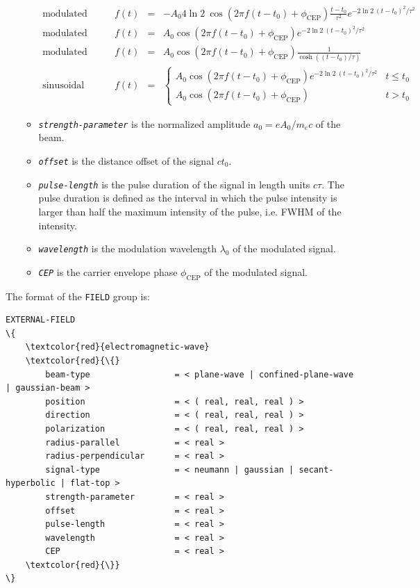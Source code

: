 \begin{enumerate}
\begin{itemize}
	\begin{equation}
	\renewcommand{\arraystretch}{1.5}
	\begin{array}{lrcl}
	\mbox{modulated Neumann:}  \qquad & f(t) & = & \displaystyle - A_0 4 \ln 2 \: \cos( 2 \pi f (t - t_0) + \phi_\mathrm{CEP} ) \frac{t - t_0}{\tau^2} e^{-2 \ln 2 \: (t - t_0)^2/\tau^2 } \\
	\mbox{modulated Gaussian:} \qquad & f(t) & = & \displaystyle A_0 \cos( 2 \pi f (t - t_0) + \phi_\mathrm{CEP} ) e^{-2 \ln 2 \: (t - t_0)^2/\tau^2 } \\
	\mbox{modulated hyperbolic secant:} \qquad & f(t) & = & \displaystyle A_0 \cos( 2 \pi f (t - t_0) + \phi_\mathrm{CEP} ) \frac{1}{\cosh ( (t - t_0)/\tau ) } \\
	\mbox{sinusoidal pulse:}   \qquad & f(t) & = & \displaystyle \left\{ \begin{array}{ll} A_0 \cos( 2 \pi f (t - t_0) + \phi_\mathrm{CEP} ) e^{-2 \ln 2 \: (t - t_0)^2/\tau^2 } & t \leq t_0 \\ A_0 \cos( 2 \pi f (t - t_0) + \phi_\mathrm{CEP} ) & t > t_0 \end{array} \right.
	\end{array}
	\end{equation}
	\item {\tt \small \em strength-parameter} is the normalized amplitude $a_0 = e A_0 / m_ec $ of the beam.
	\item {\tt \small \em offset} is the distance offset of the signal $ct_0$.
	\item {\tt \small \em pulse-length} is the pulse duration of the signal in length units $c\tau$. The pulse duration is defined as the interval in which the pulse intensity is larger than half the maximum intensity of the pulse, i.e. FWHM of the intensity.
	\item {\tt \small \em wavelength} is the modulation wavelength $\lambda_0$ of the modulated signal.
	\item {\tt \small \em CEP} is the carrier envelope phase $\phi_{\mathrm{CEP}}$ of the modulated signal.
\end{itemize}
\end{enumerate}

The format of the \texttt{FIELD} group is:
\begin{Verbatim}[frame=single, fontsize=\small, tabsize=4, fontfamily=courier, fontseries=b, commandchars=\\\{\}, obeytabs]
EXTERNAL-FIELD
\{
	\textcolor{red}{electromagnetic-wave}
	\textcolor{red}{\{}
		beam-type				  = < plane-wave | confined-plane-wave | gaussian-beam >
		position				  = < ( real, real, real ) >
		direction				  = < ( real, real, real ) >
		polarization			  = < ( real, real, real ) >
		radius-parallel			  = < real >
		radius-perpendicular	  = < real >
		signal-type				  = < neumann | gaussian | secant-hyperbolic | flat-top >
		strength-parameter		  = < real >
		offset					  = < real >
		pulse-length			  = < real >
		wavelength				  = < real >
		CEP						  = < real >
	\textcolor{red}{\}}
\}
\end{Verbatim}

